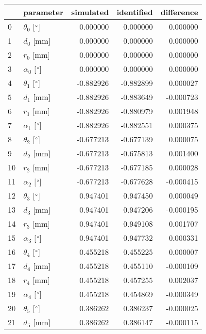 \documentclass{standalone}%
\begin{document}
%
\normalsize%
\begin{tabular}{llrrr}
\toprule
{} &                 parameter & simulated & identified & difference \\
\midrule
0  &  $\theta_{0}$ [$\degree$] &  0.000000 &   0.000000 &   0.000000 \\
1  &              $d_{0}$ [mm] &  0.000000 &   0.000000 &   0.000000 \\
2  &              $r_{0}$ [mm] &  0.000000 &   0.000000 &   0.000000 \\
3  &  $\alpha_{0}$ [$\degree$] &  0.000000 &   0.000000 &   0.000000 \\
4  &  $\theta_{1}$ [$\degree$] & -0.882926 &  -0.882899 &   0.000027 \\
5  &              $d_{1}$ [mm] & -0.882926 &  -0.883649 &  -0.000723 \\
6  &              $r_{1}$ [mm] & -0.882926 &  -0.880979 &   0.001948 \\
7  &  $\alpha_{1}$ [$\degree$] & -0.882926 &  -0.882551 &   0.000375 \\
8  &  $\theta_{2}$ [$\degree$] & -0.677213 &  -0.677139 &   0.000075 \\
9  &              $d_{2}$ [mm] & -0.677213 &  -0.675813 &   0.001400 \\
10 &              $r_{2}$ [mm] & -0.677213 &  -0.677185 &   0.000028 \\
11 &  $\alpha_{2}$ [$\degree$] & -0.677213 &  -0.677628 &  -0.000415 \\
12 &  $\theta_{3}$ [$\degree$] &  0.947401 &   0.947450 &   0.000049 \\
13 &              $d_{3}$ [mm] &  0.947401 &   0.947206 &  -0.000195 \\
14 &              $r_{3}$ [mm] &  0.947401 &   0.949108 &   0.001707 \\
15 &  $\alpha_{3}$ [$\degree$] &  0.947401 &   0.947732 &   0.000331 \\
16 &  $\theta_{4}$ [$\degree$] &  0.455218 &   0.455225 &   0.000007 \\
17 &              $d_{4}$ [mm] &  0.455218 &   0.455110 &  -0.000109 \\
18 &              $r_{4}$ [mm] &  0.455218 &   0.457255 &   0.002037 \\
19 &  $\alpha_{4}$ [$\degree$] &  0.455218 &   0.454869 &  -0.000349 \\
20 &  $\theta_{5}$ [$\degree$] &  0.386262 &   0.386237 &  -0.000025 \\
21 &              $d_{5}$ [mm] &  0.386262 &   0.386147 &  -0.000115 \\

\end{tabular}
\end{document}
